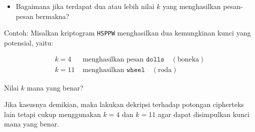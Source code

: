 \documentclass{article}
\begin{document}

\begin{itemize}
    \item Bagaimana jika terdapat dua atau lebih nilai $k$ yang menghasilkan pesan-pesan bermakna?
\end{itemize}

Contoh: Misalkan kriptogram \texttt{HSPPW} menghasilkan dua kemungkinan kunci yang potensial, yaitu:

\begin{align*}
    k = 4 & \text{ menghasilkan pesan } \texttt{dolls} \quad (\text{boneka}) \\
    k = 11 & \text{ menghasilkan } \texttt{wheel} \quad (\text{roda})
\end{align*}

Nilai $k$ mana yang benar?

Jika kasusnya demikian, maka lakukan dekripsi terhadap potongan cipherteks lain tetapi cukup menggunakan $k = 4$ dan $k = 11$ agar dapat disimpulkan kunci mana yang benar.
\end{document}
